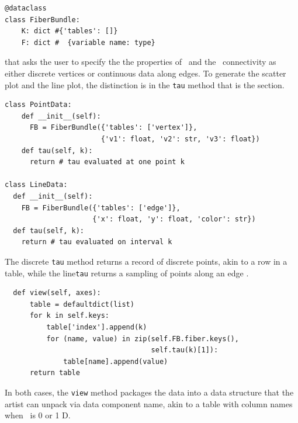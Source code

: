 \documentclass[journal]{vgtc}                %
\begin{document}
\begin{verbatim}
@dataclass
class FiberBundle:
    K: dict #{'tables': []}
    F: dict #  {variable name: type}
\end{verbatim}
that asks the user to specify the the properties of \dfiber\ and the \dbase\ connectivity as either discrete vertices or continuous data along edges. To generate the scatter plot and the line plot, the distinction is in the \texttt{tau} method that is the section. 
\begin{verbatim}
class PointData:     
    def __init__(self):
      FB = FiberBundle({'tables': ['vertex']},  
                       {'v1': float, 'v2': str, 'v3': float})
    def tau(self, k):
      return # tau evaluated at one point k

class LineData:
  def __init__(self):
    FB = FiberBundle({'tables': ['edge']},  
                     {'x': float, 'y': float, 'color': str})
  def tau(self, k):
    return # tau evaluated on interval k
\end{verbatim}
The discrete \texttt{tau} method returns a record of discrete points, akin to a row in a table, while the line\texttt{tau} returns a sampling of points along an edge \dbasepoint.
\begin{verbatim}
  def view(self, axes):
      table = defaultdict(list)
      for k in self.keys:
          table['index'].append(k)
          for (name, value) in zip(self.FB.fiber.keys(), 
                                   self.tau(k)[1]):
              table[name].append(value)
      return table
\end{verbatim}
In both cases, the \texttt{view} method packages the data into a data structure that the artist can unpack via data component name, akin to a table with column names when \dbase\ is 0 or 1 D. 
\end{document}
